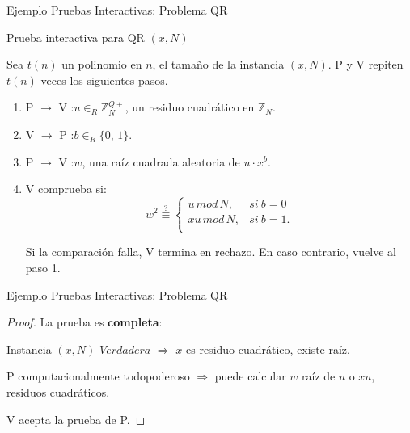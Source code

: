 \documentclass{beamer}
\begin{document}
\begin{frame}{Ejemplo Pruebas Interactivas: Problema QR}
\begin{block}{Prueba interactiva para QR $(x,N)$}
	
	Sea $t(n)$ un polinomio en $n$, el tamaño de la instancia $(x,N)$. P y V repiten $t(n)$ veces los siguientes pasos.
	
	\begin{enumerate}
		
		\item P $\rightarrow$ V :\quad $u \in_R \mathbb{Z}^{Q+}_N$, \; un residuo cuadrático en $\mathbb{Z}_N$.
		
		\item V $\rightarrow$ P :\quad $b \in_R \{0,\,1\}$.
		
		\item P $\rightarrow$ V :\quad $w$,\; una raíz cuadrada aleatoria de $u\cdot x^b$.
		
		\item V comprueba si:
		\[
		w^2 \overset{?}{\equiv}
		\begin{cases}
		u\, mod\, N, & si\ b = 0\\
		xu\, mod\, N, & si\ b = 1.\\
		\end{cases}
		\]
		
		Si la comparación falla, V termina en rechazo. En caso contrario, vuelve al paso 1.
		
	\end{enumerate}
	
\end{block}
\end{frame}


\begin{frame}{Ejemplo Pruebas Interactivas: Problema QR}
	\begin{proof}
		La prueba es \textbf{completa}:
		
		Instancia $(x,N)$ $Verdadera$ $\Rightarrow$ $x$ es residuo cuadrático, existe raíz.
		
		P computacionalmente todopoderoso $\Rightarrow$ puede calcular $w$ raíz de $u$ o $xu$, residuos cuadráticos.
		
		V acepta la prueba de P.
	\end{proof}
\end{frame}
\end{document}
